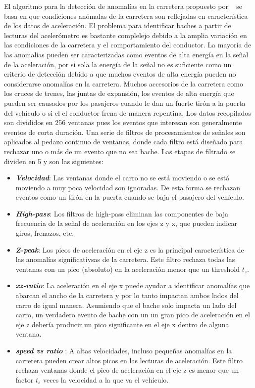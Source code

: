 El algoritmo para la detección de anomalías en la carretera propuesto por ~\cite{eriksson2008pothole} se basa en que condiciones anómalas de la carretera
son reflejadas en característica de los datos de aceleración. El problema para identificar baches a partir de lecturas del acelerómetro es bastante 
complelejo debido a la amplia variación en las condiciones de la carretera y el comportamiento del conductor. La mayoría de las anomalías pueden ser 
caracterizadas como eventos de alta energía en la señal de la aceleración, por si sola la energía de la señal no es suficiente como un criterio de 
detección debido a que muchos eventos de alta energía pueden no considerarse anomalías en la carretera. Muchos accesorios de la carretera como 
los cruces de trenes, las juntas de expansión, los eventos de alta energía que pueden ser causados por los pasajeros cuando le dan un fuerte 
tirón a la puerta del vehículo o si el el conductor frena de manera repentina. Los datos recopilados son divididos en 256 ventanas pues 
los eventos que interesan son generalmente eventos de corta duración. Una serie de filtros de procesamientos de señales son aplicados 
al  pedazo continuo de ventanas, donde cada filtro está diseñado para rechazar uno o más de un evento que no sea bache. 
Las etapas de filtrado se dividen en 5 y son las siguientes:

\begin{itemize}
	\item \emph{\textbf {Velocidad}}: Las ventanas donde el carro no se está moviendo o se está moviendo a muy poca velocidad son ignoradas. 
		De esta forma se rechazan eventos como un tirón en la puerta cuando se baja el pasajero del vehículo.\\
	\item \emph{\textbf {High-pass}}: Los filtros de high-pass eliminan las componentes de baja frecuencia de la señal de aceleración en los ejes z y x, 
		que pueden indicar giros, frenazos, etc.\\
	\item  \emph{\textbf {Z-peak}}: Los picos de aceleración en el eje z es la principal característica de las anomalías significativsas de la carretera.
		Este filtro rechaza todas las ventanas con un pico (absoluto) en la aceleración menor que un threshold $t_z$.\\
	\item  \emph{\textbf {xz-ratio}}: La aceleración en el eje x puede ayudar a identificar anomalías que abarcan el ancho de la carretera y por lo tanto 
		impactan ambos lados del carro de igual manera.  Asumiendo que el bache solo impacta un lado del carro, un verdadero evento de bache con un
		un gran pico de aceleración en el eje z debería producir un pico significante en el eje x dentro de alguna ventana.\\
	\item  \emph{\textbf {speed vs ratio }}:	A altas velocidades, incluso pequeñas anomalías en la carretera pueden crear altos picos en las lecturas 
		de aceleración. Este filtro rechaza ventanas donde el pico de aceleración en el eje z es menor que un factor $t_s$ veces la velocidad a la que 
		va el vehículo.
\end{itemize}

